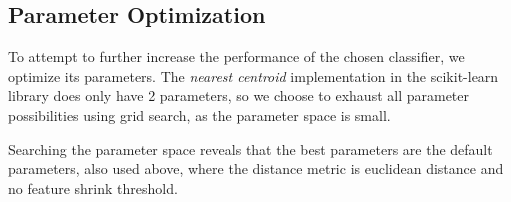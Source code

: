 
\subsection{Parameter Optimization}
To attempt to further increase the performance of the chosen classifier, we optimize its parameters. The \emph{nearest centroid} implementation in the scikit-learn library does only have 2 parameters, so we choose to exhaust all parameter possibilities using grid search, as the parameter space is small.

Searching the parameter space reveals that the best parameters are the default parameters, also used above, where the distance metric is euclidean distance and no feature shrink threshold.


